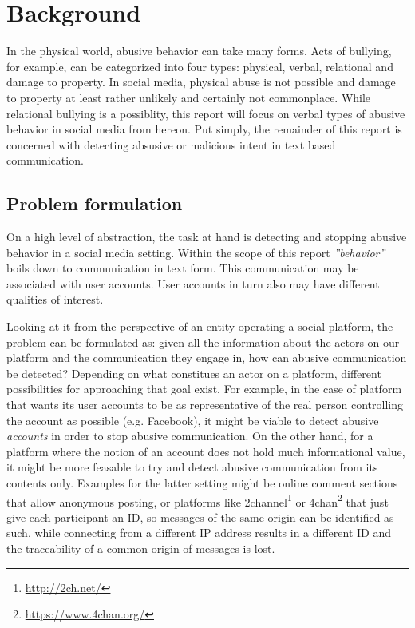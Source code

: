 \documentclass{proseminar}
\begin{document}
\section{Background}
In the physical world, abusive behavior can take many forms. Acts of bullying, for example, can be categorized into four types: physical, verbal, relational and damage to property\cite{bullying:2014}. In social media, physical abuse is not possible and damage to property at least rather unlikely and certainly not commonplace. While relational bullying is a possiblity, this report will focus on verbal types of abusive behavior in social media from hereon. Put simply, the remainder of this report is concerned with detecting absusive or malicious intent in text based communication.

\subsection{Problem formulation}
On a high level of abstraction, the task at hand is detecting and stopping abusive behavior in a social media setting. Within the scope of this report \emph{''behavior''} boils down to communication in text form. This communication may be associated with user accounts. User accounts in turn also may have different qualities of interest.

Looking at it from the perspective of an entity operating a social platform, the problem can be formulated as: given all the information about the actors on our platform and the communication they engage in, how can abusive communication be detected? Depending on what constitues an actor on a platform, different possibilities for approaching that goal exist. For example, in the case of platform that wants its user accounts to be as representative of the real person controlling the account as possible (e.g. Facebook), it might be viable to detect abusive \emph{accounts} in order to stop abusive communication. On the other hand, for a platform where the notion of an account does not hold much informational value, it might be more feasable to try and detect abusive communication from its contents only. Examples for the latter setting might be online comment sections that allow anonymous posting, or platforms like 2channel\footnote{\url{http://2ch.net/}} or 4chan\footnote{\url{https://www.4chan.org/}} that just give each participant an ID, so messages of the same origin can be identified as such, while connecting from a different IP address results in a different ID and the traceability of a common origin of messages is lost.
\end{document}
